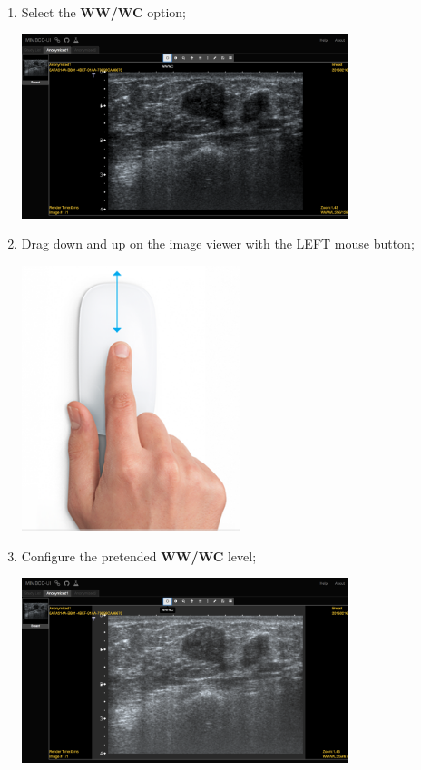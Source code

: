 \documentclass{tufte-book} %
\begin{document}
\begin{enumerate}

\item Select the \textbf{WW/WC} option;

\hfill

\begin{center}
\includegraphics[width=0.75\textwidth]{graphics/anon1_ww_off.png}
\end{center}

\hfill

\clearpage

\item Drag down and up on the image viewer with the LEFT mouse button;

\hfill

\begin{center}
\includegraphics[width=0.50\textwidth]{graphics/mouse-up-down.png}
\end{center}

\hfill

\item Configure the pretended \textbf{WW/WC} level;

\hfill

\begin{center}
\includegraphics[width=0.75\textwidth]{graphics/anon1_ww_on.png}
\end{center}


\end{enumerate}
\end{document}
